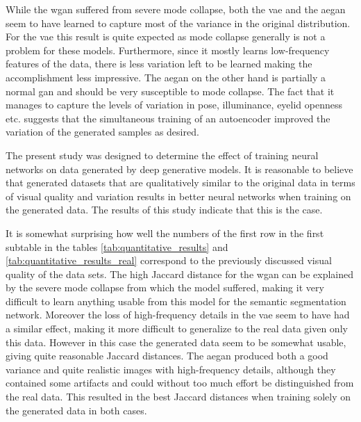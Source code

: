 While the \acrshort{wgan} suffered from severe mode collapse, both the \acrshort{vae} and the \acrshort{aegan} seem to have learned to capture most of the variance in the original distribution. For the \acrshort{vae} this result is quite expected as mode collapse generally is not a problem for these models. Furthermore, since it mostly learns low-frequency features of the data, there is less variation left to be learned making the accomplishment less impressive. The \acrshort{aegan} on the other hand is partially a normal \acrshort{gan} and should be very susceptible to mode collapse. The fact that it manages to capture the levels of variation in pose, illuminance, eyelid openness etc. suggests that the simultaneous training of an autoencoder improved the variation of the generated samples as desired.





The present study was designed to determine the effect of training neural networks on data generated by deep generative models. It is reasonable to believe that generated datasets that are qualitatively similar to the original data in terms of visual quality and variation results in better neural networks when training on the generated data. The results of this study indicate that this is the case. 

It is somewhat surprising how well the numbers of the first row in the first subtable in the tables \ref{tab:quantitative_results} and \ref{tab:quantitative_results_real} correspond to the previously discussed visual quality of the data sets. 
The high Jaccard distance for the \acrshort{wgan} can be explained by the severe mode collapse from which the model suffered, making it very difficult to learn anything usable from this model for the semantic segmentation network. Moreover the loss of high-frequency details in the \acrshort{vae} seem to have had a similar effect, making it more difficult to generalize to the real data given only this data. However in this case the generated data seem to be somewhat usable, giving quite reasonable Jaccard distances. The \acrshort{aegan} produced both a good variance and quite realistic images with high-frequency details, although they contained some artifacts and could without too much effort be distinguished from the real data. This resulted in the best Jaccard distances when training solely on the generated data in both cases.

